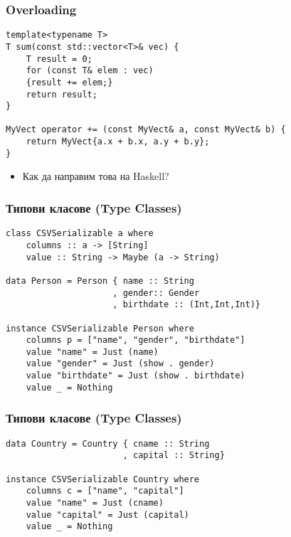 \documentclass{beamer}
\begin{document}
\begin{frame}[fragile]
\frametitle{Overloading}

\begin{lstlisting}[basicstyle=\small]
template<typename T>
T sum(const std::vector<T>& vec) {
    T result = 0;
    for (const T& elem : vec) 
    {result += elem;}
    return result;
}

MyVect operator += (const MyVect& a, const MyVect& b) {
    return MyVect{a.x + b.x, a.y + b.y};
}
\end{lstlisting}

\begin{itemize}
  \item Как да направим това на Haskell?
\end{itemize}

\end{frame}


\begin{frame}[fragile]
\frametitle{Типови класове (Type Classes)}

\begin{lstlisting}[basicstyle=\small]
class CSVSerializable a where
    columns :: a -> [String]
    value :: String -> Maybe (a -> String)

data Person = Person { name :: String
                     , gender:: Gender
                     , birthdate :: (Int,Int,Int)}

instance CSVSerializable Person where
    columns p = ["name", "gender", "birthdate"]
    value "name" = Just (name)
    value "gender" = Just (show . gender)
    value "birthdate" = Just (show . birthdate)
    value _ = Nothing
  \end{lstlisting}


\end{frame}




\begin{frame}[fragile]
\frametitle{Типови класове (Type Classes)}

\begin{lstlisting}[basicstyle=\small]
data Country = Country { cname :: String
                       , capital :: String}

instance CSVSerializable Country where
    columns c = ["name", "capital"]
    value "name" = Just (cname)
    value "capital" = Just (capital)
    value _ = Nothing
\end{lstlisting}


\end{frame}




\end{document}
